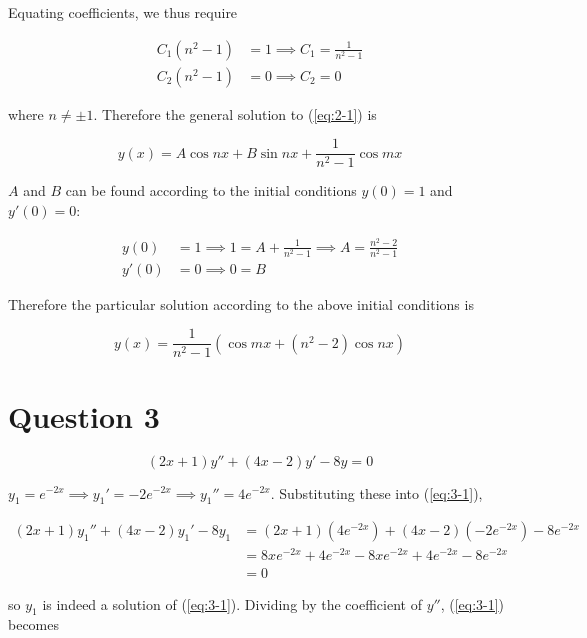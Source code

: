 \documentclass{article}
\begin{document}
Equating coefficients, we thus require

\begin{align*}
    C_1(n^2 - 1) &= 1 \implies C_1 = \frac{1}{n^2 - 1}\\
    C_2(n^2 - 1) &= 0 \implies C_2 = 0
\end{align*}

where $n \neq \pm 1$. Therefore the general solution to (\ref{eq:2-1}) is

\begin{equation} \label{eq:2-2}
    y(x) = A\cos nx + B\sin nx + \frac{1}{n^2 - 1}\cos mx
\end{equation}

$A$ and $B$ can be found according to the initial conditions $y(0) = 1$ and $y'(0) = 0$:

\begin{align*}
    y(0) &= 1 \implies 1 = A + \frac{1}{n^2 - 1} \implies A = \frac{n^2 - 2}{n^2 - 1}\\
    y'(0) &= 0 \implies 0 = B
\end{align*}

Therefore the particular solution according to the above initial conditions is

\begin{equation*}
    y(x) = \frac{1}{n^2 - 1}(\cos mx + (n^2 - 2)\cos nx)
\end{equation*}

\section*{Question 3}

\begin{equation} \label{eq:3-1}
    (2x + 1)y'' + (4x - 2)y' - 8y = 0
\end{equation}

$y_1 = e^{-2x} \implies y_1' = -2e^{-2x} \implies y_1'' = 4e^{-2x}$. Substituting these into (\ref{eq:3-1}),

\begin{align*}
    (2x + 1)y_1'' + (4x - 2)y_1' - 8y_1 &= (2x + 1)(4e^{-2x}) + (4x - 2)(-2e^{-2x}) - 8e^{-2x}\\
    &= 8xe^{-2x} + 4e^{-2x} - 8xe^{-2x} + 4e^{-2x} - 8e^{-2x}\\
    &= 0
\end{align*}

so $y_1$ is indeed a solution of (\ref{eq:3-1}). Dividing by the coefficient of $y''$, (\ref{eq:3-1}) becomes
\end{document}
